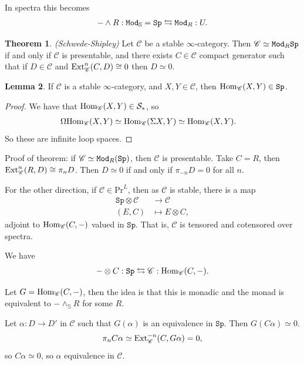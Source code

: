 \documentclass[12pt]{amsart}
\theoremstyle{definition}
\newtheorem{theorem}{Theorem}[section]
\newtheorem{lemma}[theorem]{Lemma}
\let\smashprod\wedge
\providecommand{\Sp}{\texttt{Sp}}
\providecommand{\Sp}{\text{Sp}}
\providecommand{\Pr}{\text{Pr}}
\begin{document}
In spectra this becomes
\begin{align*}
    - \smashprod R : \Mod_\mathbb{S} = \Sp \leftrightarrows \Mod_R : U.
\end{align*}

\begin{theorem} \textit{(Schwede-Shipley)} Let $\mathscr{C}$ be a stable $\infty$-category. Then $\mathscr{C}\simeq \Mod_R \Sp$ if and only if $\mathscr{C}$ is presentable, and there exists $C\in \mathscr{C}$ compact generator such that if $D\in \mathscr{C}$ and $\text{Ext}^n_\mathscr{C}(C,D) \cong 0$ then $D\simeq 0$.
\end{theorem}

\begin{lemma} If $\mathscr{C}$ is a stable $\infty$-category, and $X,Y\in \mathscr{C}$, then $\Hom_\mathscr{C}(X,Y) \in \Sp$.
\end{lemma}
\begin{proof} We have that $\text{Hom}_\mathscr{C}(X,Y) \in \mathcal{S}_\ast$, so
\begin{align*}
    \Omega\text{Hom}_\mathscr{C}(X,Y) &\simeq \text{Hom}_\mathscr{C}(\Sigma X,Y) \simeq \text{Hom}_\mathscr{C}(X,Y).
\end{align*}
So these are infinite loop spaces.
\end{proof}

Proof of theorem: if $\mathscr{C} \simeq \Mod_R(\Sp)$, then $\mathscr{C}$ is presentable. Take $C = R$, then $\text{Ext}_\mathscr{C}^n(R,D) \cong \pi_n D$. Then $D\simeq 0$ if and only if $\pi_{-n} D = 0$ for all $n$.

For the other direction, if $\mathscr{C}\in \Pr^L$, then as $\mathscr{C}$ is stable, there is a map
\begin{align*}
    \Sp \otimes \mathscr{C} &\to \mathscr{C} \\
    (E, C) &\mapsto E \otimes C,
\end{align*}
adjoint to $\text{Hom}_\mathscr{C}(C,-)$ valued in $\Sp$. That is, $\mathscr{C}$ is tensored and cotensored over spectra.

We have
\begin{align*}
    - \otimes C: \Sp \leftrightarrows \mathscr{C} : \Hom_\mathscr{C}(C,-).  
\end{align*}

Let $G = \text{Hom}_\mathscr{C}(C,-)$, then the idea is that this is monadic and the monad is equivalent to $- \smashprod_{\mathbb{S}} R$ for some $R$.

Let $\alpha: D \to D'$ in $\mathscr{C}$ such that $G(\alpha)$ is an equivalence in $\Sp$. Then $G(C\alpha) \simeq 0$.
\begin{align*}
    \pi_n C\alpha \simeq \text{Ext}_\mathscr{C}^{-n}(C,G\alpha) = 0,
\end{align*}
so $C\alpha\simeq 0$, so $\alpha$ equivalence in $\mathscr{C}$.
\end{document}

